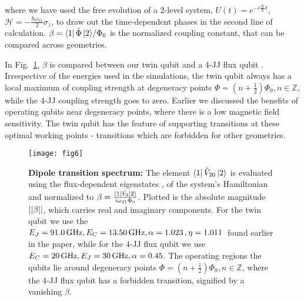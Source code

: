 \noindent   where    we   have   used    the   free    evolution   of   a    2-level   system,
$                   U(t)=e^{-i                    \frac{\mathcal{H}}{\hbar}t}                   $,
$ \mathcal{H} = -\frac{\hbar\omega_{21}}{2}\sigma_z  $, to draw out the time-dependent  phases in the second
line  of calculation.   $\beta  =  {\Bra{1}\hat{\Phi}\Ket{2}}/{\Phi_0} $  is  the normalized  coupling
constant, that can be compared across geometries.

In  Fig.~\ref{fig:fig5},  $\beta$ is  compared  between  our twin  qubit  and  a 4-JJ  flux  qubit
\cite{honigl2018} .   Irrespective of  the energies  used in the  simulations, the  twin qubit
always    has   a    local   maximum    of    coupling   strength    at   degeneracy    points
$  \Phi  =  (n+\frac{1}{2})\Phi_0,  n\in\mathbb{Z}  $,  while  the  4-JJ  coupling  strength  goes  to
zero. Earlier  we discussed  the benefits  of operating qubits  near degeneracy  points, where
there is  a low  magnetic field  sensitivity.  The twin  qubit has  the feature  of supporting
\ilra {}  transitions at these  optimal working  points - transitions  which are
forbidden for other geometries.

\begin{figure}[h]
  \centering \texttt{[image: fig6]}
  \caption{\small \textbf{Dipole  transition spectrum:} The
    element $  \Bra{1}\hat{V}_{20}\Ket{2} $  is evaluated
    using the flux-dependent eigenstates , 
    of the  system's Hamiltonian and normalized to $\beta=\frac{\Bra{1}\hat{V}_2  \Ket{2}}{i\omega_{21}\Phi_0}$. Plotted is the absolute magnitude $\left|\left|\beta\right|\right|$, which carries real and imaginary components. For the twin qubit we use the $ E_J =  91.0\,\text{GHz}, E_C  = 13.50\,\text{GHz}, \alpha  = 1.023\,\text{},  \eta =
      1.011\,\text{} $ found earlier in the paper, while for the 4-JJ flux qubit we use $ E_{C} = 20\,\text{GHz}, E_J=30\,\text{GHz}, \alpha=0.45 $. The operating regions the qubits lie around degeneracy points $  \Phi =  (n+\frac{1}{2})\Phi_0,  n\in\mathbb{Z}  $, where the 4-JJ flux qubit has a forbidden  \ilra {} transition, signified by a vanishing $\beta$.
    \label{fig:fig5}}
\end{figure}


